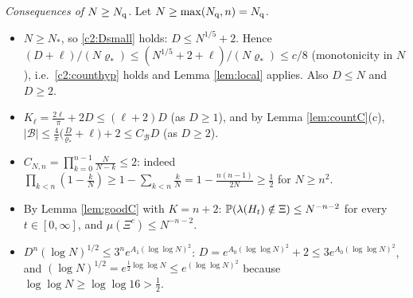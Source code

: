 \noindent\emph{Consequences of $N\ge N_{\rm q}$.} Let $N\ge\max(N_{\rm q},n)=N_{\rm q}$.
\begin{itemize}[leftmargin=1.6em,itemsep=1pt]
\item[(i)] $N\ge N_*$, so \eqref{c2:Dsmall} holds: $D\le N^{1/5}+2$. Hence $(D+\ell)/(N\varrho_*)\le(N^{1/5}+2+\ell)/(N\varrho_*)\le c/8$ (monotonicity in $N$), i.e.\ \eqref{c2:counthyp} holds and Lemma \ref{lem:local} applies. Also $D\le N$ and $D\ge2$.
\item[(ii)] $K_\ell=\frac{2\ell}\pi+2D\le(\ell+2)D$ (as $D\ge1$), and by Lemma \ref{lem:countC}(c), $|\mathcal B|\le\frac4\pi\big(\frac D{\varrho_*}+\ell\big)+2\le C_{\mathcal B}D$ (as $D\ge2$).
\item[(iii)] $C_{N,n}=\prod_{k=0}^{n-1}\frac N{N-k}\le2$: indeed $\prod_{k<n}(1-\frac kN)\ge1-\sum_{k<n}\frac kN=1-\frac{n(n-1)}{2N}\ge\frac12$ for $N\ge n^2$.
\item[(iv)] By Lemma \ref{lem:goodC} with $K=n+2$: $\P(\lambda(H_t)\notin\Xi)\le N^{-n-2}$ for every $t\in[0,\infty]$, and $\mu(\Xi^c)\le N^{-n-2}$.
\item[(v)] $D^n(\log N)^{1/2}\le3^ne^{A_1(\log\log N)^2}$: $D=e^{A_0(\log\log N)^2}+2\le3e^{A_0(\log\log N)^2}$, and $(\log N)^{1/2}=e^{\frac12\log\log N}\le e^{(\log\log N)^2}$ because $\log\log N\ge\log\log16>\frac12$.
\end{itemize}

